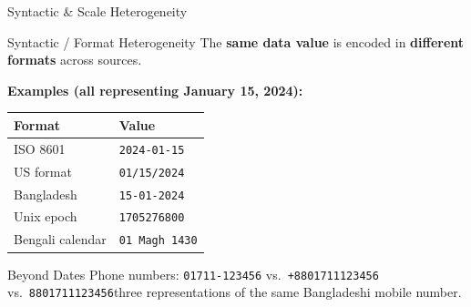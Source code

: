 \documentclass[aspectratio=169,10pt]{beamer}
\begin{document}
\begin{frame}{Syntactic \& Scale Heterogeneity} 
      \begin{block}{Syntactic / Format Heterogeneity}
        The \textbf{same data value} is encoded in \textbf{different formats} across sources.
      \end{block}
      \vspace{4pt}
      \textbf{Examples (all representing January 15, 2024):}
      \vspace{2pt}
      \renewcommand{\arraystretch}{1.2}
      \begin{tabular}{ll}
        \toprule
        \textbf{Format} & \textbf{Value} \\
        \midrule
        ISO 8601         & \texttt{2024-01-15} \\
        US format        & \texttt{01/15/2024} \\
        Bangladesh      & \texttt{15-01-2024} \\
        Unix epoch       & \texttt{1705276800} \\
        Bengali calendar & \texttt{01 Magh 1430} \\
        \bottomrule
      \end{tabular}
      \vspace{4pt}
      \begin{exampleblock}{Beyond Dates}
        Phone numbers: \texttt{01711-123456} vs.\ \texttt{+8801711123456} vs.\ \texttt{8801711123456}\textemdash three representations of the same Bangladeshi mobile number.
      \end{exampleblock}
 
\end{frame}
\end{document}
